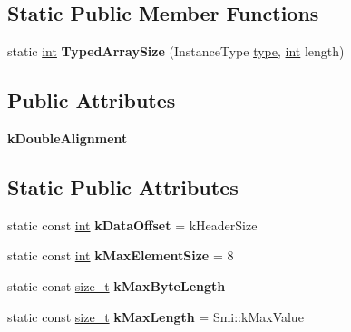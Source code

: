 \subsection*{Static Public Member Functions}
\begin{DoxyCompactItemize}
\item 
\mbox{\label{classv8_1_1internal_1_1FixedTypedArrayBase_aa4c69146e3ff4c6f0816dc13789d342e}} 
static \mbox{\hyperlink{classint}{int}} {\bfseries Typed\+Array\+Size} (Instance\+Type \mbox{\hyperlink{classstd_1_1conditional_1_1type}{type}}, \mbox{\hyperlink{classint}{int}} length)
\end{DoxyCompactItemize}
\subsection*{Public Attributes}
\begin{DoxyCompactItemize}
\item 
\mbox{\label{classv8_1_1internal_1_1FixedTypedArrayBase_a39b2e746dad19ef1180aebd05eee6b15}} 
{\bfseries k\+Double\+Alignment}
\end{DoxyCompactItemize}
\subsection*{Static Public Attributes}
\begin{DoxyCompactItemize}
\item 
\mbox{\label{classv8_1_1internal_1_1FixedTypedArrayBase_a5fd5c68af6f41a1e5659e0523b2b9444}} 
static const \mbox{\hyperlink{classint}{int}} {\bfseries k\+Data\+Offset} = k\+Header\+Size
\item 
\mbox{\label{classv8_1_1internal_1_1FixedTypedArrayBase_a056fb256037b21d3065fd08228684877}} 
static const \mbox{\hyperlink{classint}{int}} {\bfseries k\+Max\+Element\+Size} = 8
\item 
static const \mbox{\hyperlink{classsize__t}{size\+\_\+t}} {\bfseries k\+Max\+Byte\+Length}
\item 
\mbox{\label{classv8_1_1internal_1_1FixedTypedArrayBase_a7d84e65a8a3e7b433d769673384c0985}} 
static const \mbox{\hyperlink{classsize__t}{size\+\_\+t}} {\bfseries k\+Max\+Length} = Smi\+::k\+Max\+Value
\end{DoxyCompactItemize}
